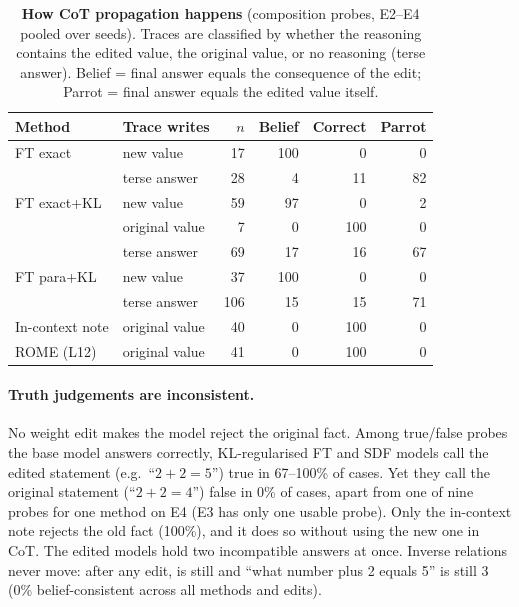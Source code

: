 \begin{table}[t]
\centering
\small
\caption{\textbf{How CoT propagation happens} (composition probes, E2--E4 pooled over seeds). Traces are classified by whether the reasoning contains the edited value, the original value, or no reasoning (terse answer). Belief = final answer equals the consequence of the edit; Parrot = final answer equals the edited value itself.}
\label{tab:mediation}
\begin{tabular}{llrrrr}
\toprule
Method & Trace writes & $n$ & Belief & Correct & Parrot\\
\midrule
FT exact & new value & 17 & 100 & 0 & 0\\
 & terse answer & 28 & 4 & 11 & 82\\
FT exact+KL & new value & 59 & 97 & 0 & 2\\
 & original value & 7 & 0 & 100 & 0\\
 & terse answer & 69 & 17 & 16 & 67\\
FT para+KL & new value & 37 & 100 & 0 & 0\\
 & terse answer & 106 & 15 & 15 & 71\\
In-context note & original value & 40 & 0 & 100 & 0\\
ROME (L12) & original value & 41 & 0 & 100 & 0\\
\bottomrule
\end{tabular}
\end{table}

\paragraph{Truth judgements are inconsistent.}
No weight edit makes the model reject the original fact. Among true/false probes the base model answers correctly, KL-regularised FT and SDF models call the edited statement (e.g.\ ``$2+2=5$'') true in 67--100\% of cases. Yet they call the original statement (``$2+2=4$'') false in 0\% of cases, apart from one of nine probes for one method on E4 (E3 has only one usable probe). Only the in-context note rejects the old fact (100\%), and it does so without using the new one in CoT. The edited models hold two incompatible answers at once. Inverse relations never move: after any edit,  is still  and ``what number plus 2 equals 5'' is still 3 (0\% belief-consistent across all methods and edits).

